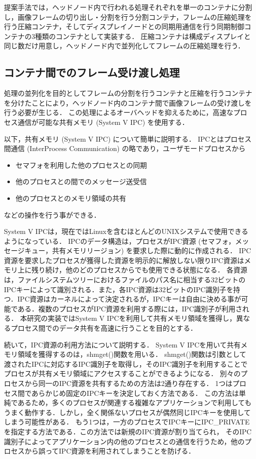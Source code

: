 提案手法では，ヘッドノード内で行われる処理それぞれを単一のコンテナに分割し，画像フレームの切り出し・分割を行う分割コンテナ，フレームの圧縮処理を行う圧縮コンテナ，そしてディスプレイノードとの同期用通信を行う同期制御コンテナの3種類のコンテナとして実装する．
圧縮コンテナは構成ディスプレイと同じ数だけ用意し，ヘッドノード内で並列化してフレームの圧縮処理を行う．

\subsection*{コンテナ間でのフレーム受け渡し処理}

処理の並列化を目的としてフレームの分割を行うコンテナと圧縮を行うコンテナを分けたことにより，ヘッドノード内のコンテナ間で画像フレームの受け渡しを行う必要が生じる．
この処理によるオーバヘッドを抑えるために，高速なプロセス通信が可能な共有メモリ (System V IPC) \cite{kerrisk2010linux,linux_kernel}を使用する．

以下，共有メモリ (System V IPC) について簡単に説明する．
IPCとはプロセス間通信 (InterProcess Communication) の略であり，ユーザモードプロセスから

\begin{itemize}
    \item セマフォを利用した他のプロセスとの同期
    \item 他のプロセスとの間でのメッセージ送受信
    \item 他のプロセスとのメモリ領域の共有
\end{itemize}

などの操作を行う事ができる．

System V IPCは，現在ではLinuxを含むほとんどのUNIXシステムで使用できるようになっている．
IPCのデータ構造は，プロセスがIPC資源 (セマフォ，メッセージキュー，共有メモリリージョン) を要求した際に動的に作成される．
IPC資源を要求したプロセスが獲得した資源を明示的に解放しない限りIPC資源はメモリ上に残り続け，他のどのプロセスからでも使用できる状態になる．
各資源は，ファイルシステムツリーにおけるファイルのパス名に相当する32ビットのIPCキーによって識別される．また，各IPC資源は32ビットのIPC識別子を持つ．IPC資源はカーネルによって決定されるが，IPCキーは自由に決める事が可能である．複数のプロセスがIPC資源を利用する際には，IPC識別子が利用される．
本研究の実装ではSystem V IPCを利用して共有メモリ領域を獲得し，異なるプロセス間でのデータ共有を高速に行うことを目的とする．

続いて，IPC資源の利用方法について説明する．
System V IPCを用いて共有メモリ領域を獲得するのは，shmget()関数を用いる．
shmget()関数は引数として渡されたIPCに対応するIPC識別子を取得し，そのIPC識別子を利用することでプロセスが共有メモリ領域にアクセスすることができるようになる．
別々のプロセスから同一のIPC資源を共有するための方法は2通り存在する．
1つはプロセス間であらかじめ固定のIPCキーを決定しておく方法である．
この方法は単純であるため，多くのプロセスが関連する複雑なアプリケーションで利用してもうまく動作する．しかし，全く関係ないプロセスが偶然同じIPCキーを使用してしまう可能性がある．
もう1つは，一方のプロセスでIPCキーにIPC\_PRIVATEを指定する方法である．この方法では新規のIPC資源が割り当てられ， そのIPC識別子によってアプリケーション内の他のプロセスとの通信を行うため，他のプロセスから誤ってIPC資源を利用されてしまうことを防げる．

